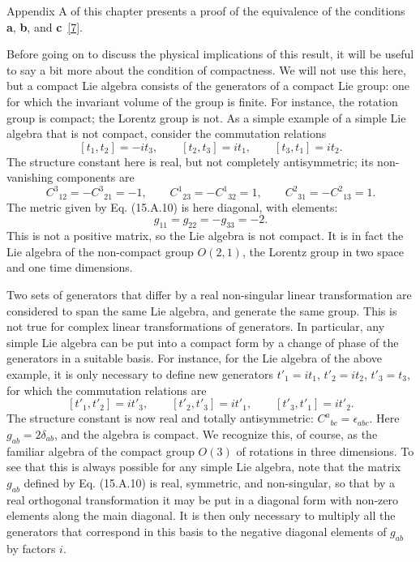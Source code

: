 Appendix A of this chapter presents a proof of the equivalence of the conditions
\textbf{a}, \textbf{b}, and \textbf{c}~\hyperref[ch15-ref-7]{[7]}.

Before going on to discuss the physical implications of this result, it will be
useful to say a bit more about the condition of compactness. We will not use this
here, but a compact Lie algebra consists of the generators of a compact Lie group:
one for which the invariant volume of the group is finite. For instance, the
rotation group is compact; the Lorentz group is not. As a simple example of a
simple Lie algebra that is not compact, consider the commutation relations
\[
 [t_1,t_2]=-it_3,\qquad [t_2,t_3]=it_1,\qquad [t_3,t_1]=it_2 .
\]
The structure constant here is real, but not completely antisymmetric; its
non-vanishing components are
\[
 C^3{}_{12}=-C^3{}_{21}=-1,\qquad
 C^1{}_{23}=-C^1{}_{32}=1,\qquad
 C^2{}_{31}=-C^2{}_{13}=1 .
\]
The metric given by Eq. (15.A.10) is here diagonal, with elements:
\[
 g_{11}=g_{22}=-g_{33}=-2 .
\]
This is not a positive matrix, so the Lie algebra is not compact. It is in fact
the Lie algebra of the non-compact group $O(2,1)$, the Lorentz group in two space
and one time dimensions.

Two sets of generators that differ by a real non-singular linear transformation
are considered to span the same Lie algebra, and generate the same group. This is
not true for complex linear transformations of generators. In particular, any
simple Lie algebra can be put into a compact form by a change of phase of the
generators in a suitable basis. For instance, for the Lie algebra of the above
example, it is only necessary to define new generators $t'_1=it_1$, $t'_2=it_2$,
$t'_3=t_3$, for which the commutation relations are
\[
 [t'_1,t'_2]=it'_3,\qquad [t'_2,t'_3]=it'_1,\qquad [t'_3,t'_1]=it'_2 .
\]
The structure constant is now real and totally antisymmetric:
$C^a{}_{bc}=\epsilon_{abc}$. Here $g_{ab}=2\delta_{ab}$, and the algebra is
compact. We recognize this, of course, as the familiar algebra of the compact
group $O(3)$ of rotations in three dimensions. To see that this is always
possible for any simple Lie algebra, note that the matrix $g_{ab}$ defined by
Eq. (15.A.10) is real, symmetric, and non-singular, so that by a real orthogonal
transformation it may be put in a diagonal form with non-zero elements along the
main diagonal. It is then only necessary to multiply all the generators that
correspond in this basis to the negative diagonal elements of $g_{ab}$ by factors
$i$.

